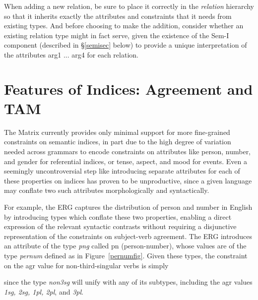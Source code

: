 \documentclass[12pt]{article}
\newcommand{\es}{\enumsentence}
\begin{document}
{When adding a new relation, be sure to place it correctly in the {\it relation}
hierarchy so that it inherits exactly the attributes and constraints that it
needs from existing types.  And before choosing to make the addition, consider
whether an existing relation type might in fact serve, given the existence of
the Sem-I component (described in \S\ref{semisec} below) to provide a unique
interpretation of the attributes {\sc arg1 ... arg4} for each relation.

\section{Features of Indices: Agreement and TAM}
\label{AgrTAM}

The Matrix currently provides only minimal support for more fine-grained
constraints on semantic indices, in part due to the high degree of variation
needed across grammars to encode constraints on attributes like person, number,
and gender for referential indices, or tense, aspect, and mood for events.
Even a seemingly uncontroversial step like introducing separate attributes for 
each of these properties on indices has proven to be unproductive, since
a given language may conflate two such attributes morphologically and
syntactically.

For example, the ERG captures the distribution of person and number in English
by introducing types which conflate these two properties, enabling a direct
expression of the relevant syntactic contrasts without requiring a disjunctive
representation of the constraints on subject-verb agreement.  The ERG 
introduces an attribute of the type {\it png} called {\sc pn} (person-number),
whose values are of the type {\it pernum} defined as in Figure~\ref{pernumfig}.
Given these types, the constraint on the {\sc agr} value for
non-third-singular verbs is simply\\

\es{
\begin{avm}
\[ {\it non3sg-verb} \\
   {\sc agr} & \[ {\sc pn} & {\it non3sg} \] \]
\end{avm}\\
}

\noindent
since the type {\it non3sg} will unify with any of its subtypes, including the
{\sc agr} values {\it 1sg, 2sg, 1pl, 2pl}, and {\it 3pl}.


}
\end{document}
